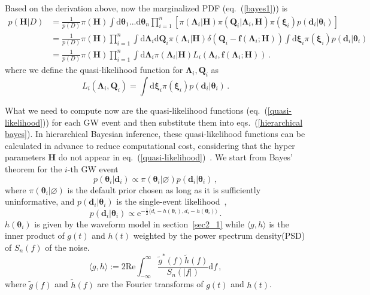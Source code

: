 \documentclass[a4paper,11pt]{article}
\begin{document}
Based on the derivation above, now the marginalized PDF (eq.~(\ref{bayes1})) is
\begin{equation}
\label{hierarchical bayes}
\begin{aligned}
p(\bm{H}|D)&=\frac{1}{p(D)}\pi(\bm{H})\int \text{d}\bm{\theta}_1...\text{d}\bm{\theta}_n \prod_{i=1}^n \left[\pi(\bm{\Lambda}_i|\bm{H})\pi(\bm{Q}_i|\bm{\Lambda}_i,\bm{H})\pi(\bm{\xi}_i)p(\bm{d}_i|\bm{\theta}_i)\right] \\
&=\frac{1}{p(D)} \pi(\bm{H}) \prod_{i=1}^n
\int \text{d}\bm{\Lambda}_i\text{d}\bm{Q}_i\pi(\bm{\Lambda}_i|\bm{H})\delta\left(\bm{Q}_i-\bm{f}(\bm{\Lambda}_i;\bm{H})\right) \int \text{d}\bm{\xi}_i \pi(\bm{\xi}_i)p(\bm{d}_i|\bm{\theta}_i)\\
&=\frac{1}{p(D)} \pi(\bm{H}) \prod_{i=1}^n
\int \text{d}\bm{\Lambda}_i\pi(\bm{\Lambda}_i|\bm{H})L_i\left(\bm{\Lambda}_i,\bm{f}(\bm{\Lambda}_i;\bm{H})\right)\,.
\end{aligned}
\end{equation}
where we define the quasi-likelihood function for $\bm{\Lambda}_i,\bm{Q}_i$ as
\begin{equation}
\label{quasi-likelihood}
    L_i(\bm{\Lambda}_i,\bm{Q}_i)=\int \text{d}\bm{\xi}_i \pi(\bm{\xi}_i)p(\bm{d}_i|\bm{\theta}_i)\,.
\end{equation}

What we need to compute now are the quasi-likelihood functions (eq.~(\ref{quasi-likelihood})) for each GW event and then 
substitute them into eqs.~(\ref{hierarchical bayes}). In hierarchical Bayesian inference, these quasi-likelihood functions 
can be calculated in advance to reduce computational cost, considering that the hyper parameters $\bm{H}$ do not appear 
in eq.~(\ref{quasi-likelihood})~\cite{Lackey:2014fwa, Thrane:2018qnx, Golomb:2021tll}. We start from Bayes' theorem for 
the $i\text{-th}$ GW event
\begin{equation}
\label{single bayes}
    p(\bm{\theta}_i|\bm{d}_i)\propto \pi(\bm{\theta}_i|\varnothing)p(\bm{d}_i|\bm{\theta}_i)\,,
\end{equation}
where $\pi(\bm{\theta}_i|\varnothing)$ is the default prior chosen as long as it is sufficiently uninformative\cite{Thrane:2018qnx}, 
and $p(\bm{d}_i|\bm{\theta}_i)$ is the single-event likelihood~\cite{Finn:1992wt},
\begin{equation}
p(\bm{d}_i|\bm{\theta}_i)\propto \mathrm{e}^{-\frac{1}{2}\langle d_i-h(\bm{\theta}_i),d_i-h(\bm{\theta}_i)\rangle}\,.
\end{equation}
$h(\bm{\theta}_i)$ is given by the waveform model in section~\ref{sec2_1} while $\langle g, h\rangle$ is the inner product 
of $g(t)$ and $h(t)$ weighted by the power spectrum density(PSD) of $S_n(f)$ of the noise.
\begin{equation}
    \langle g, h\rangle:=2\text{Re}\int_{-\infty}^{\infty}\frac{\tilde{g}^{*}(f)\tilde{h}(f)}{S_n(|f|)} \text{d}f\,,
\end{equation}
where $\tilde{g}(f)$ and $\tilde{h}(f)$ are the Fourier transforms of $g(t)$ and $h(t)$.
\end{document}

